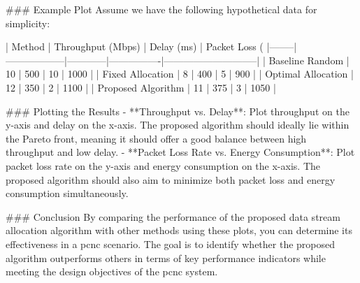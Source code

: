 ### Example Plot
Assume we have the following hypothetical data for simplicity:

| Method | Throughput (Mbps) | Delay (ms) | Packet Loss (%
|--------|------------------|------------|----------------|-----------------------------|
| Baseline Random | 10 | 500 | 10 | 1000 |
| Fixed Allocation | 8 | 400 | 5 | 900 |
| Optimal Allocation | 12 | 350 | 2 | 1100 |
| Proposed Algorithm | 11 | 375 | 3 | 1050 |

### Plotting the Results
- **Throughput vs. Delay**: Plot throughput on the y-axis and delay on the x-axis. The proposed algorithm should ideally lie within the Pareto front, meaning it should offer a good balance between high throughput and low delay.
- **Packet Loss Rate vs. Energy Consumption**: Plot packet loss rate on the y-axis and energy consumption on the x-axis. The proposed algorithm should also aim to minimize both packet loss and energy consumption simultaneously.

### Conclusion
By comparing the performance of the proposed data stream allocation algorithm with other methods using these plots, you can determine its effectiveness in a \gls{pcnc} scenario. The goal is to identify whether the proposed algorithm outperforms others in terms of key performance indicators while meeting the design objectives of the \gls{pcnc} system.